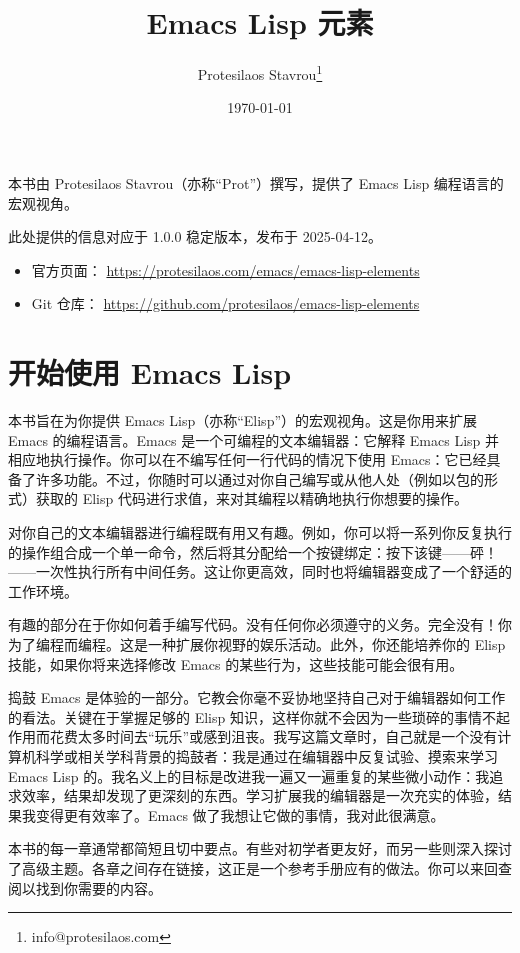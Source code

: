 \documentclass[11pt]{ctexart}
\author{Protesilaos Stavrou\thanks{info@protesilaos.com}}
\date{\today}
\title{Emacs Lisp 元素}
\begin{document}
\maketitle
本书由 Protesilaos Stavrou（亦称“Prot”）撰写，提供了 Emacs Lisp 编程语言的宏观视角。

此处提供的信息对应于 1.0.0 稳定版本，发布于 2025-04-12。

\begin{itemize}
\item 官方页面： \url{https://protesilaos.com/emacs/emacs-lisp-elements}
\item Git 仓库： \url{https://github.com/protesilaos/emacs-lisp-elements}
\end{itemize}

\setcounter{tocdepth}{8}
\tableofcontents
\section{开始使用 Emacs Lisp}
\label{sec:orgf2f5e3d}
本书旨在为你提供 Emacs Lisp（亦称“Elisp”）的宏观视角。这是你用来扩展 Emacs 的编程语言。Emacs 是一个可编程的文本编辑器：它解释 Emacs Lisp 并相应地执行操作。你可以在不编写任何一行代码的情况下使用 Emacs：它已经具备了许多功能。不过，你随时可以通过对你自己编写或从他人处（例如以包的形式）获取的 Elisp 代码进行求值，来对其编程以精确地执行你想要的操作。

对你自己的文本编辑器进行编程既有用又有趣。例如，你可以将一系列你反复执行的操作组合成一个单一命令，然后将其分配给一个按键绑定：按下该键——砰！——一次性执行所有中间任务。这让你更高效，同时也将编辑器变成了一个舒适的工作环境。

有趣的部分在于你如何着手编写代码。没有任何你必须遵守的义务。完全没有！你为了编程而编程。这是一种扩展你视野的娱乐活动。此外，你还能培养你的 Elisp 技能，如果你将来选择修改 Emacs 的某些行为，这些技能可能会很有用。

捣鼓 Emacs 是体验的一部分。它教会你毫不妥协地坚持自己对于编辑器如何工作的看法。关键在于掌握足够的 Elisp 知识，这样你就不会因为一些琐碎的事情不起作用而花费太多时间去“玩乐”或感到沮丧。我写这篇文章时，自己就是一个没有计算机科学或相关学科背景的捣鼓者：我是通过在编辑器中反复试验、摸索来学习 Emacs Lisp 的。我名义上的目标是改进我一遍又一遍重复的某些微小动作：我追求效率，结果却发现了更深刻的东西。学习扩展我的编辑器是一次充实的体验，结果我变得更有效率了。Emacs 做了我想让它做的事情，我对此很满意。

本书的每一章通常都简短且切中要点。有些对初学者更友好，而另一些则深入探讨了高级主题。各章之间存在链接，这正是一个参考手册应有的做法。你可以来回查阅以找到你需要的内容。
\end{document}

